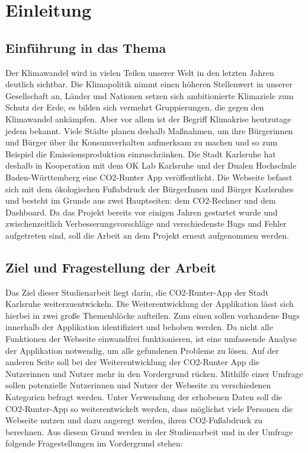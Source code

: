
\chapter{Einleitung}
\label{chapter:1}

\section{Einführung in das Thema}

Der Klimawandel wird in vielen Teilen unserer Welt in den letzten Jahren deutlich sichtbar.
Die Klimapolitik nimmt einen höheren Stellenwert in unserer Gesellschaft an, Länder und Nationen setzen sich ambitionierte Klimaziele zum Schutz der Erde, es bilden sich vermehrt Gruppierungen, die gegen den Klimawandel ankämpfen. Aber vor allem ist der Begriff Klimakrise heutzutage jedem bekannt. Viele Städte planen deshalb Maßnahmen, um ihre Bürgerinnen und Bürger über ihr Konsumverhalten aufmerksam zu machen und so zum Beispiel die Emissionsproduktion einzuschränken. Die Stadt Karlsruhe hat deshalb in Kooperation mit dem OK Lab Karlsruhe und der Dualen Hochschule Baden-Württemberg eine CO2-Runter App veröffentlicht. Die Webseite befasst sich mit dem ökologischen Fußabdruck der BürgerInnen und Bürger Karlsruhes und besteht im Grunde aus zwei Hauptseiten: dem CO2-Rechner und dem Dashboard. Da das Projekt bereits vor einigen Jahren gestartet wurde und zwischenzeitlich Verbesserungsvorschläge und verschiedenste Bugs und Fehler aufgetreten sind, soll die Arbeit an dem Projekt erneut aufgenommen werden.

\section{Ziel und Fragestellung der Arbeit}

Das Ziel dieser Studienarbeit liegt darin, die CO2-Runter-App der Stadt Karlsruhe weiterzuentwickeln. Die Weiterentwicklung der Applikation lässt sich hierbei in zwei große Themenblöcke aufteilen. Zum einen sollen vorhandene Bugs innerhalb der Applikation identifiziert und behoben werden. Da nicht alle Funktionen der Webseite einwandfrei funktionieren, ist eine umfassende Analyse der Applikation notwendig, um alle gefundenen Probleme zu lösen. Auf der anderen Seite soll bei der Weiterentwicklung der CO2-Runter App die Nutzerinnen und Nutzer mehr in den Vordergrund rücken. Mithilfe einer Umfrage sollen potenzielle Nutzerinnen und Nutzer der Webseite zu verschiedenen Kategorien befragt werden. Unter Verwendung der erhobenen Daten soll die CO2-Runter-App so weiterentwickelt werden, dass möglichst viele Personen die Webseite nutzen und dazu angeregt werden, ihren CO2-Fußabdruck zu berechnen. Aus diesem Grund werden in der Studienarbeit und in der Umfrage folgende Fragestellungen im Vordergrund stehen:

